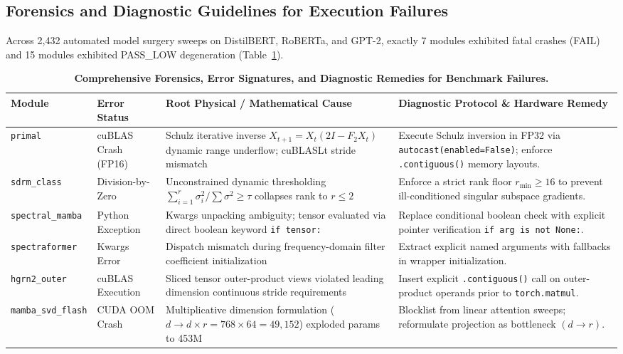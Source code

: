 \documentclass{article}
\begin{document}
\subsection{Forensics and Diagnostic Guidelines for Execution Failures}
\label{app:diagnostic_guidelines}
Across 2,432 automated model surgery sweeps on DistilBERT, RoBERTa, and GPT-2, exactly 7 modules exhibited fatal crashes (FAIL) and 15 modules exhibited PASS\_LOW degeneration (Table~\ref{tab:failures_extended}).

\begin{table}[ht]
\centering
\scriptsize
\caption{\textbf{Comprehensive Forensics, Error Signatures, and Diagnostic Remedies for Benchmark Failures.}}
\label{tab:failures_extended}
\begin{tabular}{p{2.2cm}p{1.8cm}p{4.5cm}p{4.5cm}}
\toprule
\textbf{Module} & \textbf{Error Status} & \textbf{Root Physical / Mathematical Cause} & \textbf{Diagnostic Protocol \& Hardware Remedy} \\
\midrule
\texttt{primal} & cuBLAS Crash (FP16) & Schulz iterative inverse $X_{t+1} = X_t (2I - F_2 X_t)$ dynamic range underflow; cuBLASLt stride mismatch & Execute Schulz inversion in FP32 via \texttt{autocast(enabled=False)}; enforce \texttt{.contiguous()} memory layouts. \\
\texttt{sdrm\_class} & Division-by-Zero & Unconstrained dynamic thresholding $\sum_{i=1}^r \sigma_i^2 / \sum \sigma^2 \ge \tau$ collapses rank to $r \le 2$ & Enforce a strict rank floor $r_{\min} \ge 16$ to prevent ill-conditioned singular subspace gradients. \\
\texttt{spectral\_mamba} & Python Exception & Kwargs unpacking ambiguity; tensor evaluated via direct boolean keyword \texttt{if tensor:} & Replace conditional boolean check with explicit pointer verification \texttt{if arg is not None:}. \\
\texttt{spectraformer} & Kwargs Error & Dispatch mismatch during frequency-domain filter coefficient initialization & Extract explicit named arguments with fallbacks in wrapper initialization. \\
\texttt{hgrn2\_outer} & cuBLAS Execution & Sliced tensor outer-product views violated leading dimension continuous stride requirements & Insert explicit \texttt{.contiguous()} call on outer-product operands prior to \texttt{torch.matmul}. \\
\texttt{mamba\_svd\_flash} & CUDA OOM Crash & Multiplicative dimension formulation ($d \to d \times r = 768 \times 64 = 49,152$) exploded params to 453M & Blocklist from linear attention sweeps; reformulate projection as bottleneck $(d \to r)$. \\

\end{tabular}
\end{table}
\end{document}
